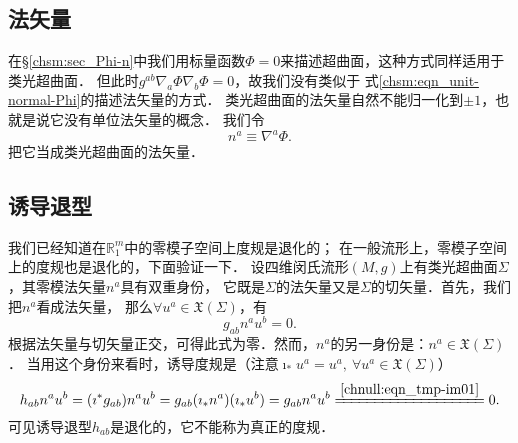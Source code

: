 \subsection{法矢量}
在\S\ref{chsm:sec_Phi-n}中我们用标量函数$\Phi=0$来描述超曲面，这种方式同样适用于类光超曲面．
但此时$g^{ab}\nabla_a \Phi\nabla_b\Phi=0$，故我们没有类似于
式\eqref{chsm:eqn_unit-normal-Phi}的描述法矢量的方式．
类光超曲面的法矢量自然不能归一化到$\pm 1$，也就是说它没有单位法矢量的概念．
我们令
\begin{equation}\label{chnull:eqn_unit-normal-Phi-null}
    n^a \equiv \nabla^a \Phi.
\end{equation}
把它当成类光超曲面的法矢量．


\subsection{诱导退型}
我们已经知道在$\mathbb{R}^m_1$中的零模子空间上度规是退化的；
在一般流形上，零模子空间上的度规也是退化的，下面验证一下．
设四维闵氏流形$(M,g)$上有类光超曲面$\Sigma$，其零模法矢量$n^a$具有双重身份，
它既是$\Sigma$的法矢量又是$\Sigma$的切矢量．首先，我们把$n^a$看成法矢量，
那么$\forall u^a \in \mathfrak{X}(\Sigma)$，有
\begin{equation}\label{chnull:eqn_tmp-im01}
    g_{ab} n^a u^b = 0.
\end{equation}
根据法矢量与切矢量正交，可得此式为零．然而，$n^a$的另一身份是：$n^a \in \mathfrak{X}(\Sigma)$．
当用这个身份来看时，诱导度规是（注意$\imath_* u^a = u^a, \  \forall u^a \in \mathfrak{X}(\Sigma)$）
\begin{equation}
    h_{ab} n^a u^b = (\imath^*g_{ab}) n^a u^b = g_{ab} (\imath_* n^a) (\imath_*u^b)
    =g_{ab} n^a u^b \xlongequal{\ref{chnull:eqn_tmp-im01}} 0.
\end{equation}
可见诱导退型$h_{ab}$是退化的，它不能称为真正的度规．

